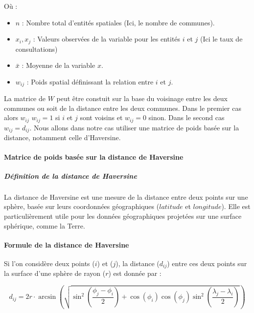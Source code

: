 \documentclass[
]{article}
\begin{document}
Où :

\begin{itemize}
\item
  \(n\) : Nombre total d'entités spatiales (Ici, le nombre de communes).
\item
  \(x_i, x_j\) : Valeurs observées de la variable pour les entités \(i\)
  et \(j\) (Ici le taux de consultations)
\item
  \(\bar{x}\) : Moyenne de la variable \(x\).
\item
  \(w_{ij}\) : Poids spatial définissant la relation entre \(i\) et
  \(j\).
\end{itemize}

La matrice de \(W\) peut être constuit sur la base du voisinage entre
les deux communes ou soit de la distance entre les deux communes. Dans
le premier cas alors \(w_{ij}\) \(w_{ij} = 1\) si \(i\) et \(j\) sont
voisins et \(w_{ij} = 0\) sinon. Dans le second cas \(w_{ij} = d_{ij}\).
Nous allons dans notre cas utiliser une matrice de poids basée sur la
distance, notamment celle d'Haversine.

\paragraph{Matrice de poids basée sur la distance de
Haversine}\label{matrice-de-poids-basuxe9e-sur-la-distance-de-haversine}

\subparagraph{Définition de la distance de
Haversine}\label{duxe9finition-de-la-distance-de-haversine}

La distance de Haversine est une mesure de la distance entre deux points
sur une sphère, basée sur leurs coordonnées géographiques (\(latitude\)
et \(longitude\)). Elle est particulièrement utile pour les données
géographiques projetées sur une surface sphérique, comme la Terre.

\paragraph{Formule de la distance de
Haversine}\label{formule-de-la-distance-de-haversine}

Si l'on considère deux points (\(i\)) et (\(j\)), la distance
(\(d_{ij}\)) entre ces deux points sur la surface d'une sphère de rayon
(\(r\)) est donnée par :

\[
 d_{ij} = 2r \cdot \arcsin\left(\sqrt{\sin^2\left(\frac{\phi_j - \phi_i}{2}\right) + \cos(\phi_i)\cos(\phi_j)\sin^2\left(\frac{\lambda_j - \lambda_i}{2}\right)}\right)
\]
\end{document}
